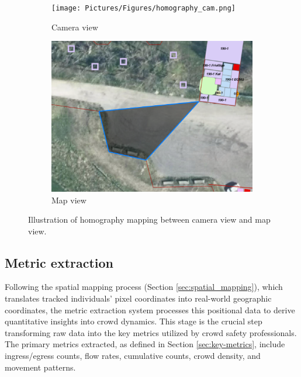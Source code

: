 \begin{figure}[htb!]
  \begin{subfigure}{0.46\textwidth}
    \centering
    \texttt{[image: Pictures/Figures/homography\_cam.png]}
    \caption{Camera view}
  \end{subfigure}%
  \hspace{0.06\textwidth}
  \begin{subfigure}{0.46\textwidth}
    \centering
    \includegraphics[width=\textwidth]{Pictures/Figures/homography_map.png}
    \caption{Map view}
  \end{subfigure}
  \caption{Illustration of homography mapping between camera view and map view.}
  \label{fig:homography_mapping}
\end{figure}


\subsection{Metric extraction}
\label{sec:metric_extraction}

Following the spatial mapping process (Section \ref{sec:spatial_mapping}), which translates tracked individuals' pixel coordinates into real-world geographic coordinates, the metric extraction system processes this positional data to derive quantitative insights into crowd dynamics. This stage is the crucial step transforming raw data into the key metrics utilized by crowd safety professionals. The primary metrics extracted, as defined in Section \ref{sec:key-metrics}, include ingress/egress counts, flow rates, cumulative counts, crowd density, and movement patterns.

